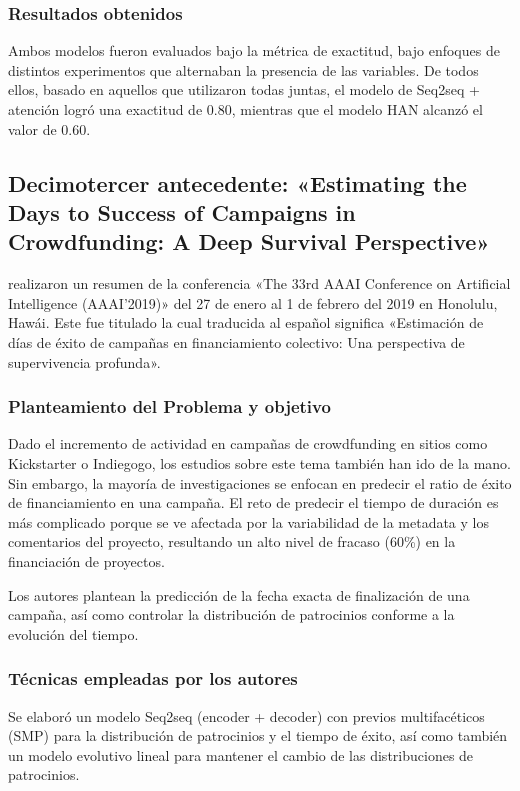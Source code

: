 \subsubsection{Resultados obtenidos}
Ambos modelos fueron evaluados bajo la métrica de exactitud, bajo enfoques de distintos experimentos que alternaban la presencia de las variables. De todos ellos, basado en aquellos que utilizaron todas juntas, el modelo de Seq2seq + atención logró una exactitud de 0.80, mientras que el modelo HAN alcanzó el valor de 0.60.

\subsection{Decimotercer antecedente: «Estimating the Days to Success of Campaigns in Crowdfunding: A Deep Survival Perspective» \citep*{pr_jin2019dayssuccess}}
\citeauthor{pr_jin2019dayssuccess} realizaron un resumen de la conferencia «The 33rd AAAI Conference on Artificial Intelligence (AAAI'2019)» del 27 de enero al 1 de febrero del 2019 en Honolulu, Hawái. Este fue titulado  la cual traducida al español significa «Estimación de días de éxito de campañas en financiamiento colectivo: Una perspectiva de supervivencia profunda».

\subsubsection{Planteamiento del Problema y objetivo}
Dado el incremento de actividad en campañas de crowdfunding en sitios como Kickstarter o Indiegogo, los estudios sobre este tema también han ido de la mano. Sin embargo, la mayoría de investigaciones se enfocan en predecir el ratio de éxito de financiamiento en una campaña. El reto de predecir el tiempo de duración es más complicado porque se ve afectada por la variabilidad de la metadata y los comentarios del proyecto, resultando un alto nivel de fracaso (60\%) en la financiación de proyectos.

Los autores plantean la predicción de la fecha exacta de finalización de una campaña, así como controlar la distribución de patrocinios conforme a la evolución del tiempo.

\subsubsection{Técnicas empleadas por los autores}
Se elaboró un modelo Seq2seq (encoder + decoder) con previos multifacéticos (SMP) para la distribución de patrocinios y el tiempo de éxito, así como también un modelo evolutivo lineal para mantener el cambio de las distribuciones de patrocinios.

